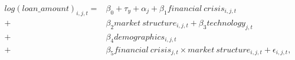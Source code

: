 \begin{equation}\begin{split}
log(loan\_amount)_{i,j,t}= & \beta_0 + \tau_{y} + \alpha_{j} + \beta_1 financial\ crisis_{i,j,t} \\ 
+ & \beta_2 market\ structure_{i,j,t} + \beta_3 technology_{j,t} \\ 
+ & \beta_4 demographics_{i,j,t}  \\
+ & \beta_5 financial\ crisis_{j,t} \times  market\ structure_{i,j,t} + \epsilon_{i,j,t},
     \end{split}\end{equation}
